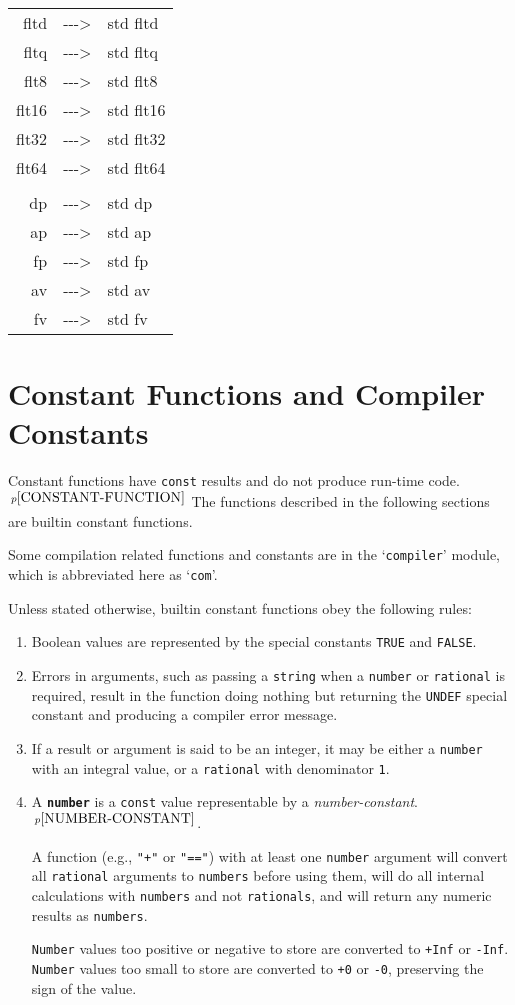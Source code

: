 \documentclass[12pt]{article}
\newcommand{\ABV}{-{}-{}->}
\newcommand{\ttkey}[1]{{\tt \bfseries #1}}
\newcommand{\pagnote}[1]{$\,^{p\pageref{#1}}$}
\begin{document}
\begin{center}
\begin{tabular}{rcl}
fltd		& \ABV & std fltd \\
fltq		& \ABV & std fltq \\
flt8		& \ABV & std flt8 \\
flt16		& \ABV & std flt16 \\
flt32		& \ABV & std flt32 \\
flt64		& \ABV & std flt64 \\
\\[1ex]
dp		& \ABV & std dp \\
ap		& \ABV & std ap \\
fp		& \ABV & std fp \\
av		& \ABV & std av \\
fv		& \ABV & std fv \\
\end{tabular}
\end{center}

\section{Constant Functions and Compiler Constants}

Constant functions have {\tt const} results
and do not produce run-time code.\pagnote{CONSTANT-FUNCTION}
The functions described in the
following sections are builtin constant functions.

Some compilation related functions and
constants are in the `{\tt compiler}' module,
which is abbreviated here as `{\tt com}'.

Unless stated otherwise, builtin constant functions
obey the following rules:
\begin{enumerate}
\item
Boolean values are represented by the special constants
{\tt TRUE} and {\tt FALSE}.
\item
Errors in arguments, such as passing a {\tt string} when a
{\tt number} or {\tt rational} is required, result in the
function doing nothing but returning
the {\tt UNDEF} special constant and producing
a compiler error message.
\item
If a result or argument is said to be an integer, it may
be either a {\tt number} with an integral value, or a
{\tt rational} with denominator {\tt 1}.
\item
A \ttkey{number} is a {\tt const} value representable by a
{\em number-constant}.\pagnote{NUMBER-CONSTANT}.

A function (e.g., {\tt "+"} or {\tt "=="})
with at least one {\tt number} argument will
convert all {\tt rational} arguments to {\tt numbers}
before using them, will do all internal calculations with
{\tt numbers} and not {\tt rationals},
and will return any numeric results as {\tt numbers}.

{\tt Number} values too positive or negative to store
are converted to {\tt +Inf} or {\tt -Inf}.
{\tt Number} values too small to store
are converted to {\tt +0} or {\tt -0}, preserving the
sign of the value.
\end{enumerate}
\end{document}
